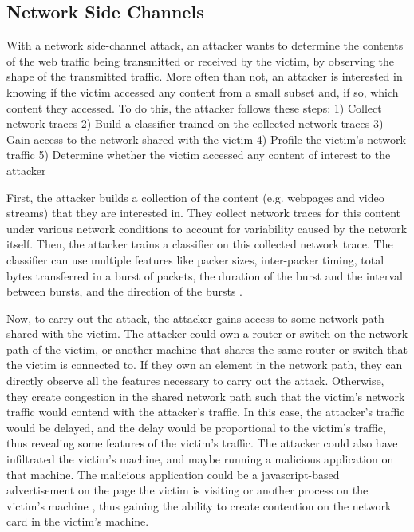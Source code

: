 \subsection{Network Side Channels}
\label{subsec:netshaper-background-network-side-channels}

With a network side-channel attack, an attacker wants to determine the contents of the web traffic being transmitted or received by the victim, by observing the shape of the transmitted traffic.
More often than not, an attacker is interested in knowing if the victim accessed any content from a small subset and, if so, which content they accessed.
To do this, the attacker follows these steps: 
1) Collect network traces
2) Build a classifier trained on the collected network traces
3) Gain access to the network shared with the victim
4) Profile the victim's network traffic
5) Determine whether the victim accessed any content of interest to the attacker

First, the attacker builds a collection of the content (e.g. webpages and video streams) that they are interested in. 
They collect network traces for this content under various network conditions to account for variability caused by the network itself. 
Then, the attacker trains a classifier on this collected network trace.
The classifier can use multiple features like packer sizes, inter-packer timing, total bytes transferred in a burst of packets, the duration of the burst and the interval between bursts, and the direction of the bursts \cite{schuster2017beautyburst}.

Now, to carry out the attack, the attacker gains access to some network path shared with the victim.
The attacker could own a router or switch on the network path of the victim, or another machine that shares the same router or switch that the victim is connected to.
If they own an element in the network path, they can directly observe all the features necessary to carry out the attack. 
Otherwise, they create congestion in the shared network path such that the victim's network traffic would contend with the attacker's traffic.
In this case, the attacker's traffic would be delayed, and the delay would be proportional to the victim's traffic, thus revealing some features of the victim's traffic.
The attacker could also have infiltrated the victim's machine, and maybe running a malicious application on that machine.
The malicious application could be a javascript-based advertisement on the page the victim is visiting or another process on the victim's machine \cite{schuster2017beautyburst}, thus gaining the ability to create contention on the network card in the victim's machine. 


